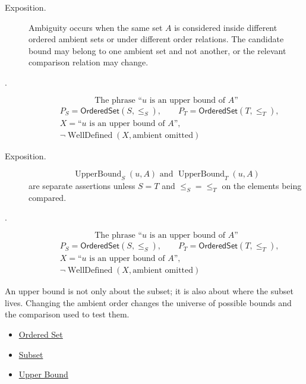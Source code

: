 \begin{remark*}
\begin{description}
  \item[Exposition.]
Ambiguity occurs when the same set $A$ is considered inside different ordered ambient sets or under different order relations. The candidate bound may belong to one ambient set and not another, or the relevant comparison relation may change.


  \item[.]
  \[
\text{The phrase ``}u\text{ is an upper bound of }A\text{''}
\]
\[
\begin{aligned}
&P_S=\mathsf{OrderedSet}(S,\le_S),\qquad
P_T=\mathsf{OrderedSet}(T,\le_T),\\
&X=\text{``$u$ is an upper bound of $A$''},\\
&\neg\operatorname{WellDefined}(X,\text{ambient omitted})
\end{aligned}
\]
\end{description}
\end{remark*}

\begin{remark*}
\begin{description}
  \item[Exposition.]
\[
\operatorname{UpperBound}_S(u,A)
\text{ and }
\operatorname{UpperBound}_T(u,A)
\]
are separate assertions unless $S=T$ and $\le_S=\le_T$ on the elements being compared.


  \item[.]
  \[
\text{The phrase ``}u\text{ is an upper bound of }A\text{''}
\]
\[
\begin{aligned}
&P_S=\mathsf{OrderedSet}(S,\le_S),\qquad
P_T=\mathsf{OrderedSet}(T,\le_T),\\
&X=\text{``$u$ is an upper bound of $A$''},\\
&\neg\operatorname{WellDefined}(X,\text{ambient omitted})
\end{aligned}
\]
\end{description}
\end{remark*}

\begin{remark*}[Interpretation]
An upper bound is not only about the subset; it is also about where the subset lives. Changing the ambient order changes the universe of possible bounds and the comparison used to test them.
\end{remark*}

\begin{dependencies}
\begin{itemize}
  \item \hyperref[def:ordered-set]{Ordered Set}
  \item \hyperref[def:subset]{Subset}
  \item \hyperref[def:real-upper-bound]{Upper Bound}
\end{itemize}
\end{dependencies}


